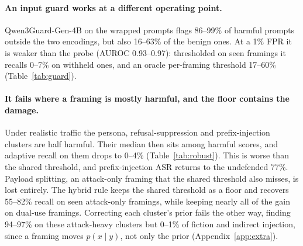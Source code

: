\documentclass[11pt]{article}
\begin{document}
\begin{table}[t]
\centering
\resizebox{\columnwidth}{!}{}
\caption{Grouping ablation, benign-rich traffic, $k_{\max}{=}30$ (post hoc). Recall (\%); FPR averaged over 13 framings.}
\label{tab:ablation}
\end{table}

\paragraph{An input guard works at a different operating point.}
Qwen3Guard-Gen-4B on the wrapped prompts flags 86--99\% of harmful prompts outside the two encodings, but also 16--63\% of the benign ones. At a 1\% FPR it is weaker than the probe (AUROC 0.93--0.97): thresholded on seen framings it recalls 0--7\% on withheld ones, and an oracle per-framing threshold 17--60\% (Table~\ref{tab:guard}).

\paragraph{It fails where a framing is mostly harmful, and the floor contains the damage.}
Under realistic traffic the persona, refusal-suppression and prefix-injection clusters are half harmful. Their median then sits among harmful scores, and adaptive recall on them drops to 0--4\% (Table~\ref{tab:robust}). This is worse than the shared threshold, and prefix-injection ASR returns to the undefended 77\%. Payload splitting, an attack-only framing that the shared threshold also misses, is lost entirely. The hybrid rule keeps the shared threshold as a floor and recovers 55--82\% recall on seen attack-only framings, while keeping nearly all of the gain on dual-use framings. Correcting each cluster's prior \citep{saerens2002adjusting,lipton2018bbse} fails the other way, finding 94--97\% on these attack-heavy clusters but 0--1\% of fiction and indirect injection, since a framing moves $p(x\mid y)$, not only the prior (Appendix~\ref{app:extra}).

\begin{table}[t]
\centering
\resizebox{\columnwidth}{!}{}
\caption{Judged ASR (\%) on half B under realistic traffic, $k_{\max}{=}30$ (post hoc), by two judges on the same windows; mean and 95\% interval over 10 windows. Base64 omitted (judge artefact, Section~\ref{sec:setup}). Last row: over-refusal on plain benign requests.}
\label{tab:generation}
\end{table}
\end{document}

